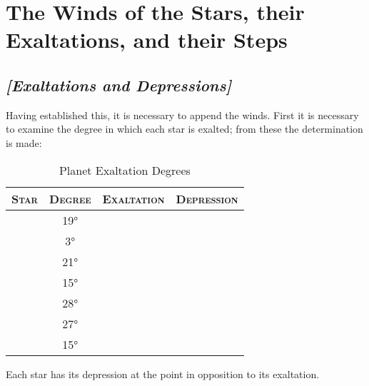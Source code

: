\section{The Winds of the Stars, their Exaltations, and their Steps}
\subsection{\textit{[Exaltations and Depressions]}}
Having established this, it is necessary to append the winds. First it is necessary to examine the  degree in which each star is exalted; from these the determination is made:

\begin{table}[h]
\caption{Planet Exaltation Degrees}
\vspace{-1em}
\begin{center}
\begin{tabular}{cccc}
\toprule
\textsc{Star} & \textsc{Degree} 
	& \textsc{Exaltation} & \textsc{Depression} \\
\midrule
\Sun 		& 19°		& \Aries 			& \Libra			\\
\Moon		&   3° 		& \Taurus			& \Scorpio  		\\
\Saturn		& 21°		& \Libra			& \Aries			\\
\Jupiter		& 15°		& \Cancer			& \Capricorn		\\
\Mars		& 28°		& \Capricorn		& \Cancer 		\\
\Venus		& 27°		& \Pisces			& \Virgo 			\\
\Mercury	& 15°		& \Virgo			& \Pisces			\\
\bottomrule
\end{tabular}
\end{center}
\end{table}
\vspace{-1em}
Each star has its depression at the point in opposition to its exaltation.

